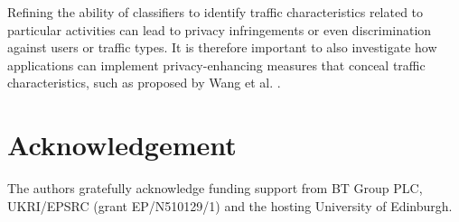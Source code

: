 \documentclass[10pt,conference]{IEEEtran}
\begin{document}
Refining the ability of classifiers to identify traffic characteristics related to particular activities can lead to privacy infringements or even discrimination against users or traffic types. It is therefore important to also investigate how applications can implement privacy-enhancing measures that conceal traffic characteristics, such as proposed by Wang et al. \cite{wang2017walkie}.









\section*{Acknowledgement}
The authors gratefully acknowledge funding support from BT Group PLC, UKRI/EPSRC (grant EP/N510129/1) and the hosting University of Edinburgh.


 


\end{document}
